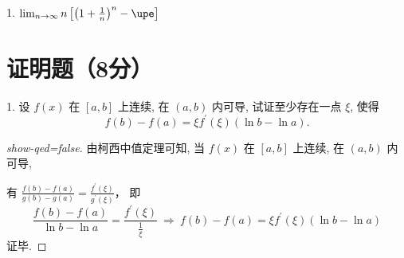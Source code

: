 \documentclass{SEUExam}
\begin{document}
1. $\lim _{n \to \infty} n\left[\left(1+\frac{1}{n}\right)^{n}-\upe\right]$

\section{证明题（8分）}

1. 设 $f(x)$ 在 $[a, b]$ 上连续, 在 $(a, b)$ 内可导, 试证至少存在一点 $\xi$, 使得
  $$f(b)-f(a)=\xi f^{\prime}(\xi)(\ln b-\ln a).$$

\begin{proof}[show-qed=false]
  由柯西中值定理可知, 当 $f(x)$ 在 $[a, b]$ 上连续, 在 $(a, b)$ 内可导,

  有
  $\frac{f(b)-f(a)}{g(b)-g(a)}=\frac{f^{\prime}(\xi)}{g^{\prime}(\xi)}$，
  即
  $$\frac{f(b)-f(a)}{\ln b-\ln a}=\frac{f^{\prime}(\xi)}{\frac{1}{\xi}}
    ~\Rightarrow~
    f(b)-f(a)=\xi f^{\prime}(\xi)(\ln b-\ln a) $$
  证毕.
\end{proof}
\end{document}
